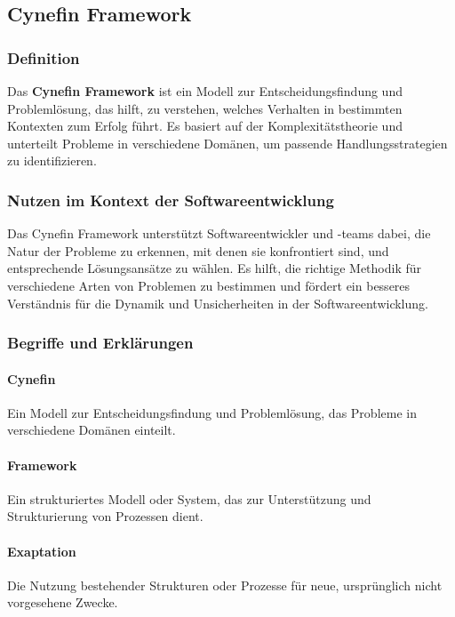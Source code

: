 \subsection{Cynefin Framework}

\subsubsection{Definition}

Das \textbf{Cynefin Framework} ist ein Modell zur Entscheidungsfindung und Problemlösung, das hilft, zu verstehen, welches Verhalten in bestimmten Kontexten zum Erfolg führt. Es basiert auf der Komplexitätstheorie und unterteilt Probleme in verschiedene Domänen, um passende Handlungsstrategien zu identifizieren.

\subsubsection{Nutzen im Kontext der Softwareentwicklung}

Das Cynefin Framework unterstützt Softwareentwickler und -teams dabei, die Natur der Probleme zu erkennen, mit denen sie konfrontiert sind, und entsprechende Lösungsansätze zu wählen. Es hilft, die richtige Methodik für verschiedene Arten von Problemen zu bestimmen und fördert ein besseres Verständnis für die Dynamik und Unsicherheiten in der Softwareentwicklung.

\subsubsection{Begriffe und Erklärungen}

\paragraph{Cynefin} Ein Modell zur Entscheidungsfindung und Problemlösung, das Probleme in verschiedene Domänen einteilt.

\paragraph{Framework} Ein strukturiertes Modell oder System, das zur Unterstützung und Strukturierung von Prozessen dient.

\paragraph{Exaptation} Die Nutzung bestehender Strukturen oder Prozesse für neue, ursprünglich nicht vorgesehene Zwecke.

